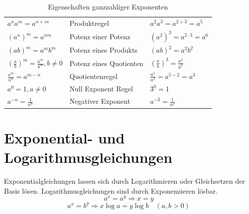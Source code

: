 \documentclass[a4paper]{article}
\begin{document}
\begin{table}[b]
\renewcommand*{\arraystretch}{1.4}
\centering
\begin{tabular}{l l l} \hline
$a^{n}a^{m} = a^{n+m}$  & Produktregel & $a^{2}a^{3} = a^{2+3} = a^{5}$ \\
$(a^{n})^{m} = a^{nm}$ & Potenz einer Potenz & $(a^{2})^{3} = a^{2\cdot3} = a^{6}$ \\
$(ab)^{m} = a^{m}b^{m}$ & Potenz eines Produkts & $(ab)^{2} = a^{2}b^{2}$ \\
$(\frac{a}{b})^{m} = \frac{a^{m}}{b^{m}}, b \neq 0$ & Potenz eines Quotienten & $(\frac{a}{b})^{3} = \frac{a^{3}}{b^{3}}$ \\
$\frac{a^{m}}{a^{n}} = a^{m-n} $ & Quotientenregel & $\frac{a^{5}}{a^{2}} = a^{5-2} = a^{3}$ \\
$a^{0} = 1,a \neq 0$ & Null Exponent Regel & $3^{0} = 1$ \\
$a^{-n} = \frac{1}{a^{n}}$ & Negativer Exponent & $a^{-3} = \frac{1}{a^{3}}$ \\
\hline
\end{tabular}
\caption{\label{tab:Exponenten}{Eigenschaften ganzzahliger Exponenten}}
\end{table}

\section{Exponential- und Logarithmusgleichungen}
Exponentialgleichungen lassen sich durch Logarithmieren oder Gleichsetzen der Basis lösen. Logarithmusgleichungen sind durch Exponenzieren lösbar.
\[ a^x=a^y \Rightarrow x=y \]
\[ a^x =b^y \Rightarrow x\log a =y \log b \quad(a,b >0) \]
\end{document}

